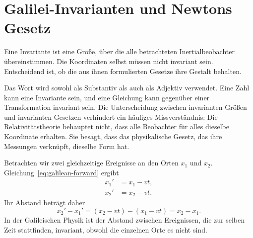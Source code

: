 \begin{classroomqa}
\end{classroomqa}

\section{Galilei-Invarianten und Newtons Gesetz}

Eine Invariante ist eine Größe, über die alle betrachteten Inertialbeobachter übereinstimmen. Die Koordinaten selbst müssen nicht invariant sein. Entscheidend ist, ob die aus ihnen formulierten Gesetze ihre Gestalt behalten.

Das Wort wird sowohl als Substantiv als auch als Adjektiv verwendet. Eine Zahl kann eine Invariante sein, und eine Gleichung kann gegenüber einer Transformation invariant sein. Die Unterscheidung zwischen invarianten Größen und invarianten Gesetzen verhindert ein häufiges Missverständnis: Die Relativitätstheorie behauptet nicht, dass alle Beobachter für alles dieselbe Koordinate erhalten. Sie besagt, dass das physikalische Gesetz, das ihre Messungen verknüpft, dieselbe Form hat.

Betrachten wir zwei gleichzeitige Ereignisse an den Orten \(x_1\) und \(x_2\). Gleichung~\eqref{eq:galilean-forward} ergibt
\begin{align}
x_1'&=x_1-vt,\\
x_2'&=x_2-vt.
\end{align}
Ihr Abstand beträgt daher
\begin{equation}
x_2'-x_1'=(x_2-vt)-(x_1-vt)=x_2-x_1.
\end{equation}
In der Galileischen Physik ist der Abstand zwischen Ereignissen, die zur selben Zeit stattfinden, invariant, obwohl die einzelnen Orte es nicht sind.

